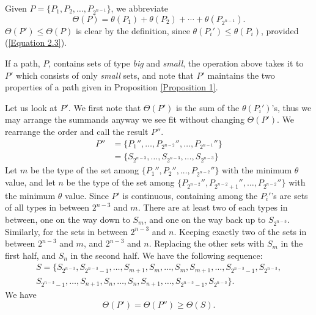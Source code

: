 \documentclass[12pt]{ucthesis}
\theoremstyle{plain}
\theoremstyle{definition}
\begin{document}
Given $P = \{P_1, P_2, \dots, P_{2^{n - 1}}\}$, we abbreviate
\begin{equation*}
\Theta(P) = \theta(P_1) + \theta(P_2) + \cdots + \theta(P_{2^{n - 1}}).
\end{equation*}
$\Theta(P') \le \Theta(P)$ is clear by the definition,
since $\theta(P_i') \le \theta(P_i)$, provided (\ref{Equation 2.3}).

If a path, $P$, contains sets of type \emph{big} and \emph{small},
the operation above takes it to $P'$ which consists of only \emph{small} sets,
and note that $P'$ maintains the two properties of a path given in Proposition \ref{Proposition 1}.

Let us look at $P'$.
We first note that $\Theta(P')$ is the sum of the $\theta(P_i')$'s,
thus we may arrange the summands anyway we see fit without changing $\Theta(P')$.
We rearrange the order and call the result $P''$.
\begin{align*}
P'' & = \{P_1'', \dots, P_{2^{n - 2}}'', \dots, P_{2^{n - 1}}''\} \\
    & = \{S_{2^{n - 3}}, \dots, S_{2^{n - 3}}, \dots, S_{2^{n - 3}}\}
\end{align*}
Let $m$ be the type of the set among $\{P_1'', P_2'', \dots, P_{2^{n - 2}}''\}$
with the minimum $\theta$ value,
and let $n$ be the type of the set among $\{P_{2^{n - 2}}'', P_{2^{n - 2} + 1}'', \dots, P_{2^{n - 2}}''\}$
with the minimum $\theta$ value.
Since $P'$ is continuous,
containing among the $P_i'$'s are sets of all types in between $2^{n - 3}$ and $m$.
There are at least two of each types in between,
one on the way down to $S_m$, and one on the way back up to $S_{2^{n - 3}}$.
Similarly, for the sets in between $2^{n - 3}$ and $n$.
Keeping exactly two of the sets in between $2^{n - 3}$ and $m$, and $2^{n - 3}$ and $n$.
Replacing the other sets with $S_m$ in the first half, and $S_n$ in the second half.
We have the following sequence:
\begin{align*}
S = \{S_{2^{n - 3}}, S_{2^{n - 3} - 1}, \dots, S_{m + 1}, S_m, \dots, S_m, S_{m + 1},
\dots, S_{2^{n - 3} - 1}, S_{2^{n - 3}}, \\
S_{2^{n - 3} - 1}, \dots, S_{n + 1}, S_n,
\dots, S_n, S_{n + 1}, \dots, S_{2^{n - 3} - 1}, S_{2^{n - 3}}\}.
\end{align*}
We have
\begin{equation*}
\Theta(P') = \Theta(P'') \ge \Theta(S).
\end{equation*}
\end{document}
